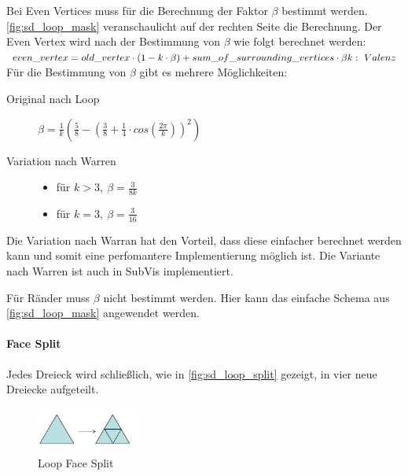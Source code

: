Bei Even Vertices muss für die Berechnung der Faktor \(\beta\) bestimmt werden.
\autoref{fig:sd_loop_mask} veranschaulicht auf der rechten Seite die Berechnung.
Der Even Vertex wird nach der Bestimmung von \(\beta\) wie folgt berechnet werden:\\
\(
even\_vertex = old\_vertex \cdot (1 - k \cdot \beta) + sum\_of\_surrounding\_vertices \cdot \beta\\
k:\ Valenz
\)
\\
Für die Bestimmung von \(\beta\) gibt es mehrere Möglichkeiten:
\begin{description}
\item[Original nach Loop]  \(\beta=\frac{1}{k}(\frac{5}{8}-(\frac{3}{8}+\frac{1}{4} \cdot cos(\frac{2\pi}{k}))^2)\)
\item[Variation nach Warren] \mbox{}
	\begin{itemize}
		\item für \(k > 3,\ \beta = \frac{3}{8k}\)
		\item für \(k = 3,\ \beta = \frac{3}{16}\)	
	\end{itemize}
\end{description}
Die Variation nach Warran hat den Vorteil, dass diese einfacher berechnet werden kann
und somit eine perfomantere Implementierung möglich ist.
Die Variante nach Warren ist auch in SubVis implementiert.

Für Ränder muss \(\beta\) nicht bestimmt werden.
Hier kann das einfache Schema aus \autoref{fig:sd_loop_mask} angewendet werden.
\cite{Carnegie}
\cite{Standford.Loop}
\cite[S. 70 f.]{Zorin.subdivcourse}

\paragraph*{Face Split}

Jedes Dreieck wird schließlich, wie in \autoref{fig:sd_loop_split} gezeigt, in vier neue Dreiecke aufgeteilt.

\begin{figure}
\centering
\includegraphics[width=0.3\textwidth]{content/media/sd_loop_split.png}
\caption{Loop Face Split \cite[S. 56 f.]{Standford.24.07.2015}}
\label{fig:sd_loop_split}
\end{figure}

